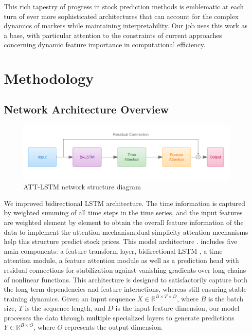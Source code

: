 \documentclass[10pt,twocolumn,letterpaper]{article}
\begin{document}
This rich tapestry of progress in stock prediction methods is emblematic at each turn of ever more sophisticated architectures that can account for the complex dynamics of markets while maintaining interpretability. Our job uses this work as a base, with particular attention to the constraints of current approaches concerning dynamic feature importance in computational efficiency.

\section{Methodology}
\subsection{Network Architecture Overview}
\begin{figure}[H]
	\centering
	\includegraphics[width=\linewidth]{1.png}
	\caption{ATT-LSTM network structure diagram}
	\label{fig:ATT-LSTM network structure diagram}
\end{figure}
We  improved bidirectional LSTM architecture. The time information is captured by weighted summing of all time steps in the time series, and the input features are weighted element by element to obtain the overall feature information of the data to implement the attention mechanism,dual simplicity attention mechanisms help this structure predict stock prices. This model architecture . includes five main components: a feature transform layer, bidirectional LSTM , a time attention module, a feature attention module as well as a prediction head with residual connections for stabilization against vanishing gradients over long chains of nonlinear functions. This architecture is designed to satisfactorily capture both the long-term dependencies and feature interactions, whereas still ensuring stable training dynamics.
Given an input sequence $X \in \mathbb{R}^{B \times T \times D}$, where $B$ is the batch size, $T$ is the sequence length, and $D$ is the input feature dimension, our model processes the data through multiple specialized layers to generate predictions $Y \in \mathbb{R}^{B \times O}$, where $O$ represents the output dimension.
\end{document}
